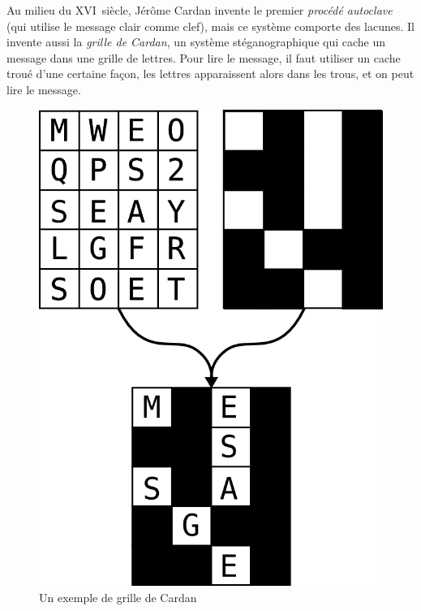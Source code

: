 Au milieu du XVI\ieme~siècle, Jérôme Cardan invente le premier
\emph{procédé autoclave} (qui utilise le message clair comme clef),
mais ce système comporte des lacunes. Il invente aussi la \emph{grille
  de Cardan}, un système stéganographique qui cache un message dans
une grille de lettres. Pour lire le message, il faut utiliser un cache
troué d'une certaine façon, les lettres apparaissent alors dans les
trous, et on peut lire le message. \\

\begin{figure}[h]
  \begin{center}
    \includegraphics[scale=0.2]{images/GrilleCardan.png}
  \end{center}
  \caption{Un exemple de grille de Cardan}
  \label{fig:GrilleCardan}
\end{figure}

